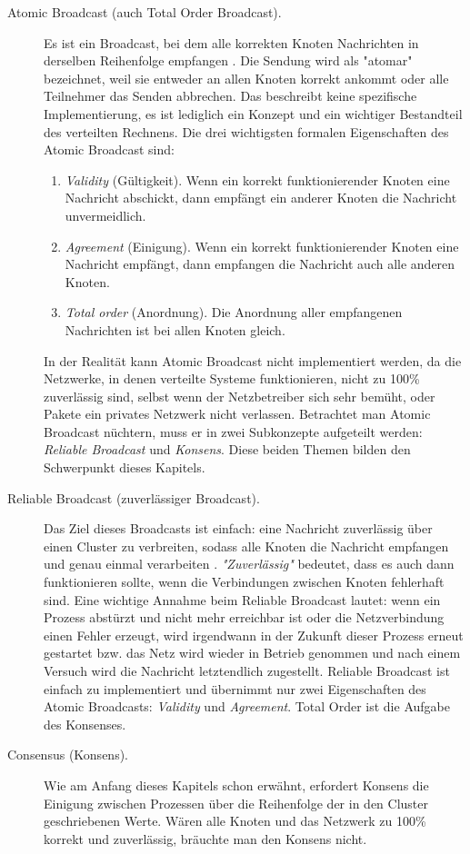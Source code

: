 \begin{description}
	\item[Atomic Broadcast (auch Total Order Broadcast).] Es ist ein Broadcast, bei dem alle korrekten Knoten Nachrichten in derselben Reihenfolge empfangen \cite{Défago04totalorder}. Die Sendung wird als "atomar" bezeichnet, weil sie entweder an allen Knoten korrekt ankommt oder alle Teilnehmer das Senden abbrechen. Das beschreibt keine spezifische Implementierung, es ist lediglich ein Konzept und ein wichtiger Bestandteil des verteilten Rechnens. Die drei wichtigsten formalen Eigenschaften des Atomic Broadcast sind:
	
	\begin{enumerate}
		\item \textit{Validity} (Gültigkeit). Wenn ein korrekt funktionierender Knoten eine Nachricht abschickt, dann empfängt ein anderer Knoten die Nachricht unvermeidlich.
		
		\item \textit{Agreement} (Einigung). Wenn ein korrekt funktionierender Knoten eine Nachricht empfängt, dann empfangen die Nachricht auch alle anderen Knoten.
		
		\item \textit{Total order} (Anordnung). Die Anordnung aller empfangenen Nachrichten ist bei allen Knoten gleich.
	\end{enumerate}
	
	In der Realität kann Atomic Broadcast nicht implementiert werden, da die Netzwerke, in denen verteilte Systeme funktionieren, nicht zu 100\% zuverlässig sind, selbst wenn der Netzbetreiber sich sehr bemüht, oder Pakete ein privates Netzwerk nicht verlassen. Betrachtet man Atomic Broadcast nüchtern, muss er in zwei Subkonzepte aufgeteilt werden: \textit{Reliable Broadcast} und \textit{Konsens}. Diese beiden Themen bilden den Schwerpunkt dieses Kapitels.
	
	\item[Reliable Broadcast (zuverlässiger Broadcast).] Das Ziel dieses Broadcasts ist einfach: eine Nachricht zuverlässig über einen Cluster zu verbreiten, sodass alle Knoten die Nachricht empfangen und genau einmal verarbeiten \cite{Défago04totalorder}. \textit{"Zuverlässig"} bedeutet, dass es auch dann funktionieren sollte, wenn die Verbindungen zwischen Knoten fehlerhaft sind. Eine wichtige Annahme beim Reliable Broadcast lautet: wenn ein Prozess abstürzt und nicht mehr erreichbar ist oder die Netzverbindung einen Fehler erzeugt, wird irgendwann in der Zukunft dieser Prozess erneut gestartet bzw. das Netz wird wieder in Betrieb genommen und nach einem Versuch wird die Nachricht letztendlich zugestellt. Reliable Broadcast ist einfach zu implementiert und übernimmt nur zwei Eigenschaften des Atomic Broadcasts: \textit{Validity} und \textit{Agreement}. Total Order ist die Aufgabe des Konsenses.
	
	\item[Consensus (Konsens).] Wie am Anfang dieses Kapitels schon erwähnt, erfordert Konsens die Einigung zwischen Prozessen über die Reihenfolge der in den Cluster geschriebenen Werte. Wären alle Knoten und das Netzwerk zu 100\% korrekt und zuverlässig, bräuchte man den Konsens nicht.
\end{description}

